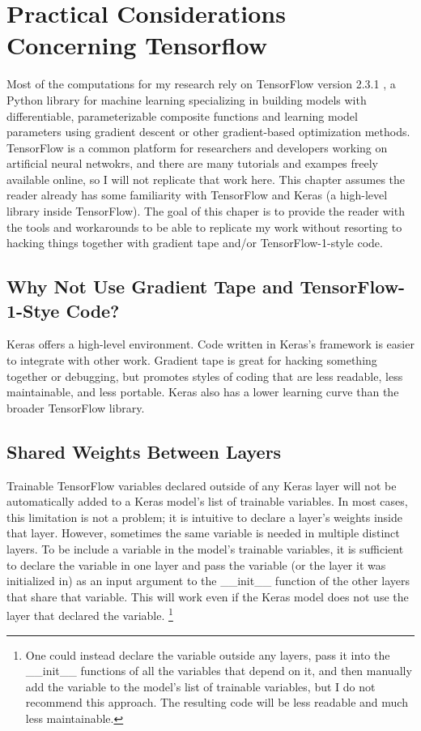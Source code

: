 \chapter{Practical Considerations Concerning Tensorflow}
Most of the computations for my research rely on TensorFlow version 2.3.1 \cite{tensorflow}, a Python library for machine learning specializing in building models with differentiable, parameterizable composite functions and learning model parameters using gradient descent or other gradient-based optimization methods. TensorFlow is a common platform for researchers and developers working on artificial neural netwokrs, and there are many tutorials and exampes freely available online, so I will not replicate that work here. This chapter assumes the reader already has some familiarity with TensorFlow and Keras \cite{keras} (a high-level library inside TensorFlow). The goal of this chaper is to provide the reader with the tools and workarounds to be able to replicate my work without resorting to hacking things together with gradient tape and/or TensorFlow-1-style code.

\section{Why Not Use Gradient Tape and TensorFlow-1-Stye Code?}
Keras offers a high-level environment. Code written in Keras's framework is easier to integrate with other work. Gradient tape is great for hacking something together or debugging, but promotes styles of coding that are less readable, less maintainable, and less portable. Keras also has a lower learning curve than the broader TensorFlow library.


\section{Shared Weights Between Layers}
Trainable TensorFlow variables declared outside of any Keras layer will not be automatically added to a Keras model's list of trainable variables. In most cases, this limitation is not a problem; it is intuitive to declare a layer's weights inside that layer. However, sometimes the same variable is needed in multiple distinct layers. To be include a variable in the model's trainable variables, it is sufficient to declare the variable in one layer and pass the variable (or the layer it was initialized in) as an input argument to the \_\_init\_\_ function of the other layers that share that variable. This will work even if the Keras model does not use the layer that declared the variable. \footnote{One could instead declare the variable outside any layers, pass it into the \_\_init\_\_ functions of all the variables that depend on it, and then manually add the variable to the model's list of trainable variables, but I do not recommend this approach. The resulting code will be less readable and much less maintainable.}

